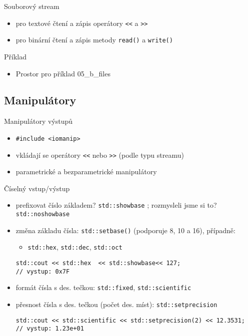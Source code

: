 \documentclass{beamer}
\begin{document}
\begin{xframe}{Souborový stream}
	\begin{itemize}
		\item pro textové čtení a zápis operátory \texttt{<<} a \texttt{>>}
		\item pro binární čtení a zápis metody \texttt{read()} a \texttt{write()}
	\end{itemize}
\end{xframe}

\begin{xframe}{Příklad}
	\begin{itemize}
		\item Prostor pro příklad 05\_b\_files
	\end{itemize}
\end{xframe}

\subsection{Manipulátory}

\begin{xframe}{Manipulátory výstupů}
	\begin{itemize}
		\item \texttt{\#include <iomanip>}
		\item vkládají se operátory \texttt{<<} nebo \texttt{>>} (podle typu streamu)
		\item parametrické a bezparametrické manipulátory
	\end{itemize}
\end{xframe}

\begin{xframe}{Číselný vstup/výstup}
	\begin{itemize}
		\item prefixovat číslo základem? \texttt{std::showbase} ; rozmysleli jsme si to? \texttt{std::noshowbase}
		\item změna základu čísla: \texttt{std::setbase()} (podporuje 8, 10 a 16), případně:
			\begin{itemize}
				\item \texttt{std::hex}, \texttt{std::dec}, \texttt{std::oct}
			\end{itemize}
\begin{lstlisting}[basicstyle=\fontsize{8}{9}\selectfont\ttfamily]
std::cout << std::hex  << std::showbase<< 127;
// vystup: 0x7F
\end{lstlisting}

		\item formát čísla s des. tečkou: \texttt{std::fixed}, \texttt{std::scientific}
		\item přesnost čísla s des. tečkou (počet des. míst): \texttt{std::setprecision}
\begin{lstlisting}[basicstyle=\fontsize{8}{9}\selectfont\ttfamily]
std::cout << std::scientific << std::setprecision(2) << 12.3531;
// vystup: 1.23e+01
\end{lstlisting}
	\end{itemize}
\end{xframe}
\end{document}
